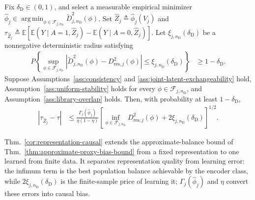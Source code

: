 \begin{theorem}
\label{cor:representation-causal}
	Fix $\delta_{\mathrm D}\in(0,1)$, and select a measurable empirical minimizer $\widehat\phi_j \in \operatorname*{arg\,min}_{\phi\in\mathcal F_{j,n_{\mathrm D}}} \widetilde D_{j,n_{\mathrm D}}^2(\phi)$. Set $\widehat Z_j\triangleq\widehat\phi_j(V_j)$ and $\tau_{\widehat Z_j}\triangleq \mathbb E[ \mathbb E(Y\mid A=1,\widehat Z_j) - \mathbb E(Y\mid A=0,\widehat Z_j)]$. Let $\xi_{j,n_{\mathrm D}}(\delta_{\mathrm D})$ be a nonnegative deterministic radius satisfying
	\begin{align}\label{eq:uniform-discrepancy-radius}
		P\left\{
		\sup_{\phi\in\mathcal F_{j,n_{\mathrm D}}}
		\left|
		\widetilde D_{j,n_{\mathrm D}}^2(\phi)
		-
		D_{\mathrm{res},j}^2(\phi)
		\right|
		\le
		\xi_{j,n_{\mathrm D}}(\delta_{\mathrm D})
		\right\}
		&\ge
		1-\delta_{\mathrm D}.
	\end{align}
	Suppose Assumptions~\ref{ass:consistency} and \ref{ass:joint-latent-exchangeability} hold, Assumption~\ref{ass:uniform-stability} holds for every $\phi\in\mathcal F_{j,n_{\mathrm D}}$, and Assumption~\ref{ass:library-overlap} holds. Then, with probability at least $1-\delta_{\mathrm D}$,
	\begin{align}\label{eq:representation-oracle-causal}
		|\tau_{\widehat Z_j}-\tau| &\le
		\frac{\Gamma_j(\widehat\phi_j)}{\eta(1-\eta)}
		\left[
		\inf_{\phi\in\mathcal F_{j,n_{\mathrm D}}}
		D_{\mathrm{res},j}^2(\phi)
		+
		2\xi_{j,n_{\mathrm D}}(\delta_{\mathrm D})
		\right]^{1/2}.
	\end{align}
\end{theorem}
Thm.~\ref{cor:representation-causal} extends the approximate-balance bound of Thm.~\ref{thm:approximate-proxy-bias-bound} from a fixed representation to one learned from finite data. It separates representation quality from learning error: the infimum term is the best population balance achievable by the encoder class, while $2\xi_{j,n_{\mathrm D}}(\delta_{\mathrm D})$ is the finite-sample price of learning it; $\Gamma_j(\widehat\phi_j)$ and $\eta$ convert these errors into causal bias.

